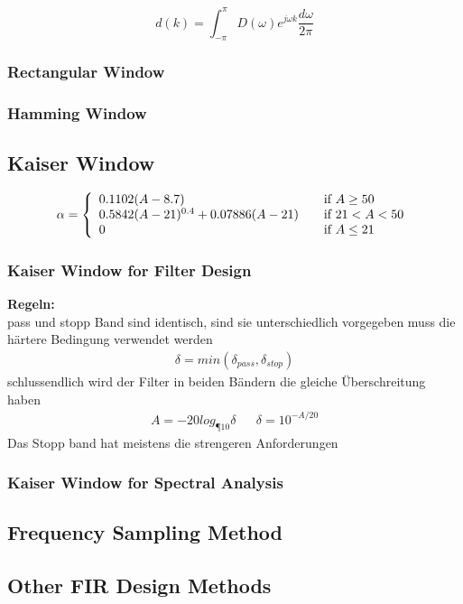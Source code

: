 \begin{equation}
d(k) = \int_{-\pi}^{\pi}D(\omega) e^{j\omega k}\frac{d\omega}{2\pi} \label{eq:impresp}
\end{equation}

\subsubsection{Rectangular Window}
\subsubsection{Hamming Window}

\subsection{Kaiser Window}
\begin{align*}
	\alpha = \left\{
		\begin{array}{l l}
			0.1102(A-8.7)& \quad \text{if } A \geq 50\\
			0.5842(A-21)^{0.4}+0.07886(A-21) & \quad \text{if }21 < A < 50\\
			0 & \quad \text{if } A \leq 21
		\end{array} \right.
\end{align*}
\subsubsection{Kaiser Window for Filter Design}


\textbf{Regeln:}\\
pass und stopp Band sind identisch, sind sie unterschiedlich vorgegeben muss die härtere Bedingung verwendet werden \\
\begin{align*}
\delta=min(\delta_{pass},\delta_{stop})
\end{align*}
schlussendlich wird der Filter in beiden Bändern die gleiche Überschreitung haben
\begin{align*}
A=-20log_{¶10}\delta && \delta=10^{-A/20}
\end{align*}
Das Stopp band hat meistens die strengeren Anforderungen
\subsubsection{Kaiser Window for Spectral Analysis}
\subsection{Frequency Sampling Method}

\subsection{Other FIR Design Methods}

